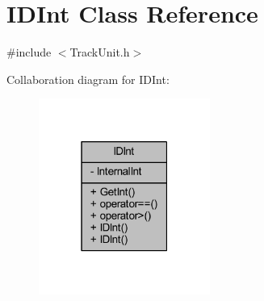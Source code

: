 \hypertarget{class_i_d_int}{}\section{I\+D\+Int Class Reference}
\label{class_i_d_int}


{\ttfamily \#include $<$Track\+Unit.\+h$>$}



Collaboration diagram for I\+D\+Int\+:\nopagebreak
\begin{figure}[H]
\begin{center}
\leavevmode
\includegraphics[width=159pt]{class_i_d_int__coll__graph}
\end{center}
\end{figure}
